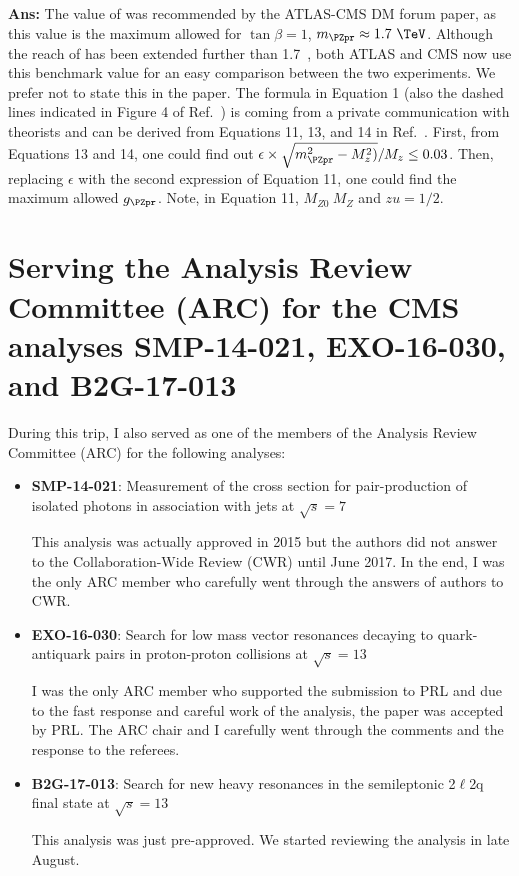 \begin{enumerate}
{\bf Ans:} The value of  was recommended by the ATLAS-CMS DM forum paper, as this value is the maximum allowed \gzp for $\tan\beta=1$, $\mzp \approx 1.7 ~\TeV$. Although the reach of \mzp has been extended further than 1.7~\TeV, 
both ATLAS and CMS now use this benchmark value for an easy comparison between 
the two experiments. We prefer not to state this in the paper. The formula in 
Equation 1 (also the dashed lines indicated in Figure 4 of Ref.~\cite{2HDM}) 
is coming from a private communication with theorists and can be derived from 
Equations 11, 13, and 14 in Ref.~\cite{2HDM}. First, from Equations 13 and 14, 
one could find out $\epsilon \times \sqrt{\mzp^2-M_z^2)}/M_z \leq 0.03$. Then, 
replacing $\epsilon$ with the second expression of Equation 11, one could find 
the maximum allowed $\gzp$. Note, in Equation 11, $M_{Z0}~M_Z$ and $zu = 1/2$. 


\end{enumerate}

\section{Serving the Analysis Review Committee (ARC) for the CMS analyses SMP-14-021, EXO-16-030, and B2G-17-013}
During this trip, I also served as one of the members of the Analysis Review Committee (ARC) for the following analyses: 
 \begin{itemize}
 \item {\bf SMP-14-021}: Measurement of the cross section for pair-production of isolated photons in association with jets at $\sqrt{s} = 7$~\TeV

 This analysis was actually approved in 2015 but the authors did not answer to the Collaboration-Wide Review (CWR) until June 2017. In the end, I was the only ARC member who carefully went through the answers of authors to CWR.
 \item {\bf EXO-16-030}: Search for low mass vector resonances decaying to quark-antiquark pairs in proton-proton collisions at $\sqrt{s} = 13$~\TeV 

 I was the only ARC member who supported the submission to PRL and due to the fast response and careful work of the analysis, the paper was accepted by PRL. The ARC chair and I carefully went through the comments and the response to the referees.  
 \item {\bf B2G-17-013}: Search for new heavy resonances in the semileptonic 2$\ell$2q final state at $\sqrt{s} = 13$~\TeV

This analysis was just pre-approved. We started reviewing the analysis in late August.
 \end{itemize}


